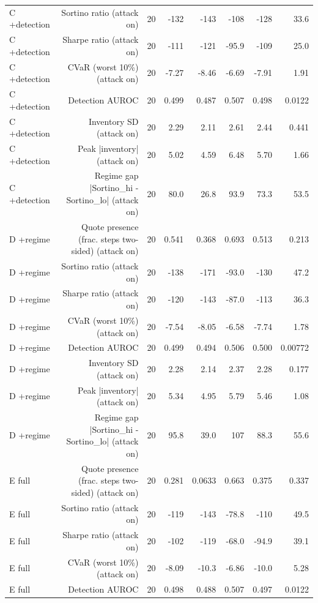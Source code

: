 \begin{table}[htbp]
\begin{tabular}{lrrrrrrr}
    C  +detection & Sortino ratio (attack on) & 20 & -132 & -143 & -108 & -128 & 33.6 \\
    C  +detection & Sharpe ratio (attack on) & 20 & -111 & -121 & -95.9 & -109 & 25.0 \\
    C  +detection & CVaR (worst 10\%) (attack on) & 20 & -7.27 & -8.46 & -6.69 & -7.91 & 1.91 \\
    C  +detection & Detection AUROC & 20 & 0.499 & 0.487 & 0.507 & 0.498 & 0.0122 \\
    C  +detection & Inventory SD (attack on) & 20 & 2.29 & 2.11 & 2.61 & 2.44 & 0.441 \\
    C  +detection & Peak |inventory| (attack on) & 20 & 5.02 & 4.59 & 6.48 & 5.70 & 1.66 \\
    C  +detection & Regime gap  |Sortino\_hi - Sortino\_lo| (attack on) & 20 & 80.0 & 26.8 & 93.9 & 73.3 & 53.5 \\
    D  +regime & Quote presence (frac. steps two-sided) (attack on) & 20 & 0.541 & 0.368 & 0.693 & 0.513 & 0.213 \\
    D  +regime & Sortino ratio (attack on) & 20 & -138 & -171 & -93.0 & -130 & 47.2 \\
    D  +regime & Sharpe ratio (attack on) & 20 & -120 & -143 & -87.0 & -113 & 36.3 \\
    D  +regime & CVaR (worst 10\%) (attack on) & 20 & -7.54 & -8.05 & -6.58 & -7.74 & 1.78 \\
    D  +regime & Detection AUROC & 20 & 0.499 & 0.494 & 0.506 & 0.500 & 0.00772 \\
    D  +regime & Inventory SD (attack on) & 20 & 2.28 & 2.14 & 2.37 & 2.28 & 0.177 \\
    D  +regime & Peak |inventory| (attack on) & 20 & 5.34 & 4.95 & 5.79 & 5.46 & 1.08 \\
    D  +regime & Regime gap  |Sortino\_hi - Sortino\_lo| (attack on) & 20 & 95.8 & 39.0 & 107 & 88.3 & 55.6 \\
    E  full & Quote presence (frac. steps two-sided) (attack on) & 20 & 0.281 & 0.0633 & 0.663 & 0.375 & 0.337 \\
    E  full & Sortino ratio (attack on) & 20 & -119 & -143 & -78.8 & -110 & 49.5 \\
    E  full & Sharpe ratio (attack on) & 20 & -102 & -119 & -68.0 & -94.9 & 39.1 \\
    E  full & CVaR (worst 10\%) (attack on) & 20 & -8.09 & -10.3 & -6.86 & -10.0 & 5.28 \\
    E  full & Detection AUROC & 20 & 0.498 & 0.488 & 0.507 & 0.497 & 0.0122 \\

\end{tabular}
\end{table}
